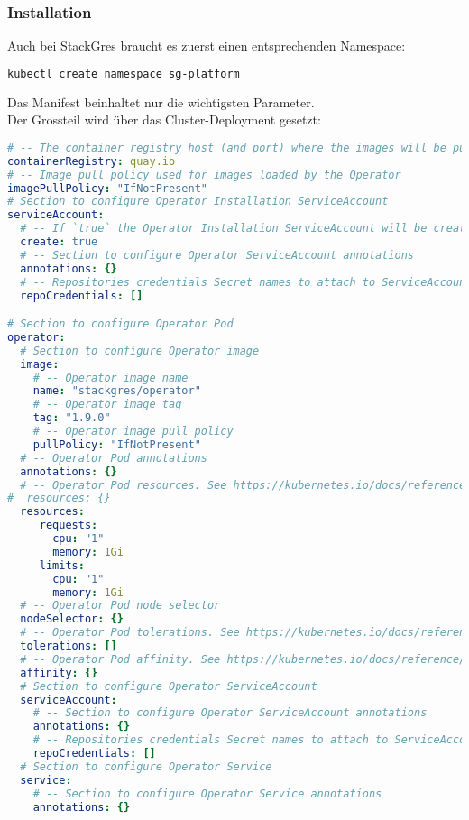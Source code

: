 \subsubsection{Installation}
Auch bei StackGres braucht es zuerst einen entsprechenden Namespace:
\lstset{style=gra_codestyle}
\begin{lstlisting}[language=bash, caption=StackGres-Citus - Namespace,captionpos=b,label={lst:stackgres-citus-namespace},breaklines=true]
kubectl create namespace sg-platform
\end{lstlisting}

Das Manifest beinhaltet nur die wichtigsten Parameter.\\
Der Grossteil wird über das Cluster-Deployment gesetzt:
\lstset{style=gra_codestyle}
\begin{lstlisting}[language=yaml, caption=StackGres-Citus - Helm Chart Manifest,captionpos=b,label={lst:stackgres_citus-values.yaml},breaklines=true]
# -- The container registry host (and port) where the images will be pulled from.
containerRegistry: quay.io
# -- Image pull policy used for images loaded by the Operator
imagePullPolicy: "IfNotPresent"
# Section to configure Operator Installation ServiceAccount
serviceAccount:
  # -- If `true` the Operator Installation ServiceAccount will be created
  create: true
  # -- Section to configure Operator ServiceAccount annotations
  annotations: {}
  # -- Repositories credentials Secret names to attach to ServiceAccounts and Pods
  repoCredentials: []

# Section to configure Operator Pod
operator:
  # Section to configure Operator image
  image:
    # -- Operator image name
    name: "stackgres/operator"
    # -- Operator image tag
    tag: "1.9.0"
    # -- Operator image pull policy
    pullPolicy: "IfNotPresent"
  # -- Operator Pod annotations
  annotations: {}
  # -- Operator Pod resources. See https://kubernetes.io/docs/reference/generated/kubernetes-api/v1.27/#resourcerequirements-v1-core
#  resources: {}
  resources:
     requests:
       cpu: "1"
       memory: 1Gi
     limits:
       cpu: "1"
       memory: 1Gi
  # -- Operator Pod node selector
  nodeSelector: {}
  # -- Operator Pod tolerations. See https://kubernetes.io/docs/reference/generated/kubernetes-api/v1.27/#toleration-v1-core
  tolerations: []
  # -- Operator Pod affinity. See https://kubernetes.io/docs/reference/generated/kubernetes-api/v1.27/#affinity-v1-core
  affinity: {}
  # Section to configure Operator ServiceAccount
  serviceAccount:
    # -- Section to configure Operator ServiceAccount annotations
    annotations: {}
    # -- Repositories credentials Secret names to attach to ServiceAccounts and Pods
    repoCredentials: []
  # Section to configure Operator Service
  service:
    # -- Section to configure Operator Service annotations
    annotations: {}


\end{lstlisting}
